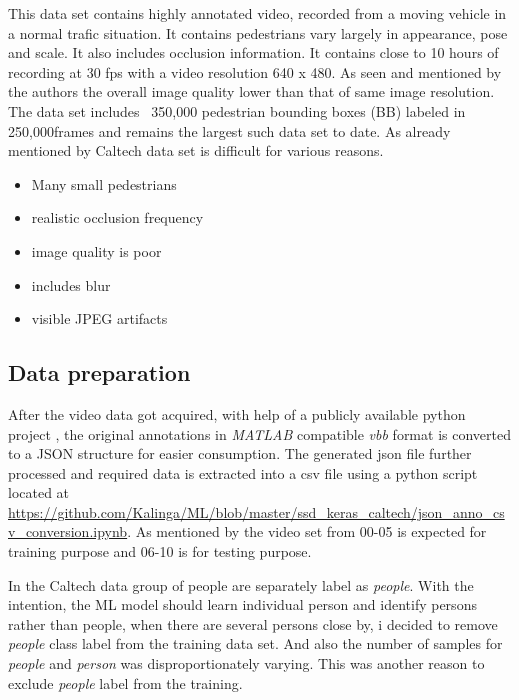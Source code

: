 \newpara
This data set contains highly annotated video, recorded from a moving vehicle in a normal trafic situation. It contains pedestrians vary largely in appearance, pose and scale. It also includes occlusion information. It contains close to 10 hours of recording at 30 fps with a video resolution 640 x 480. As seen and mentioned by the authors the overall image quality lower than that of same image resolution. The data set includes ~350,000  pedestrian bounding boxes (BB) labeled in 250,000frames and remains the largest such data set to  date. As already mentioned by \cite{walk2010new} Caltech data set is difficult for various reasons.

\begin{itemize}
	\setlength\itemsep{-1em}
	\item Many small pedestrians
	\item realistic occlusion frequency
	\item image quality is poor
	\item includes blur
	\item visible JPEG artifacts
\end{itemize}

\subsection{Data preparation}
After the video data got acquired, with help of a publicly available python project \cite{shuntasaito2015}, the original annotations in \textit{MATLAB} compatible \textit{vbb} format is converted to a JSON structure for easier consumption. The generated json file further processed and required data is extracted into a csv file using a python script located at \url{ https://github.com/Kalinga/ML/blob/master/ssd_keras_caltech/json_anno_csv_conversion.ipynb}. As mentioned by \cite{dollar2009pedestrian} the video set from 00-05 is expected for training purpose and 06-10 is for testing purpose.

In the Caltech data group of people are separately label as \textit{people}. With the intention, the ML model should learn individual person and identify persons rather than people, when there are several persons close by, i decided to remove \textit{people} class label from the training data set. And also the number of samples for \textit{people} and \textit{person} was disproportionately varying. This was another reason to exclude \textit{people }label from  the training. 


